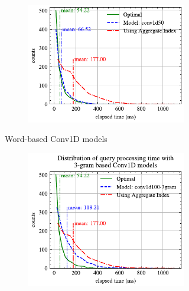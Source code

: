 \documentclass[conference]{IEEEtran}
\begin{document}
\begin{figure}[!h]
\begin{subfigure}{0.45\textwidth}
\begin{subfigure}{\textwidth}
			\includegraphics[]{graphics/perf_dist_conv1d50_B.pdf}
		\end{subfigure}
		\caption{Word-based Conv1D models}
	\end{subfigure}
	\hfill
	\begin{subfigure}{0.45\textwidth}
		\begin{subfigure}{\textwidth}
			\centering
			\includegraphics[]{graphics/perf_dist_conv1d100_3gram_B.pdf}
		\end{subfigure}
		\vfill
		\begin{subfigure}{\textwidth}
			\centering

\end{subfigure}
\end{subfigure}
\end{figure}
\end{document}
